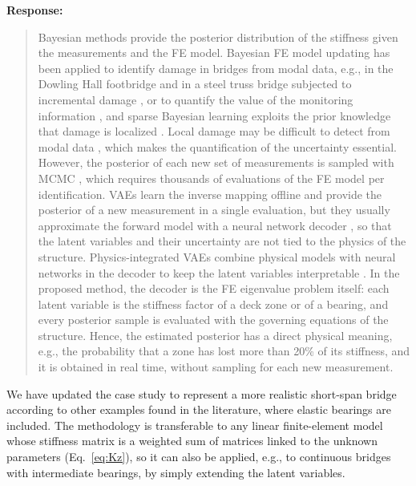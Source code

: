 \documentclass[11pt]{article}
\newenvironment{response}{\par\smallskip\noindent\color{resp}\textbf{Response:}\ }{\par}
\newenvironment{action}{\par\smallskip\noindent\color{resp}\textbf{Action:}\ }{\par}
\newcommand{\authornote}[1]{\textcolor{note}{\textsf{[Authors: #1]}}}
\newcommand{\tbd}[1]{\textcolor{note}{\textsf{[#1]}}}
\newcommand{\lines}[1]{\tbd{lines #1}}
\begin{document}
\begin{response}
\begin{quote}
Bayesian methods provide the posterior distribution of the stiffness given the measurements and the FE model.
Bayesian FE model updating has been applied to identify damage in bridges from modal data, e.g., in the Dowling Hall footbridge \cite{behmanesh2015probabilistic} and in a steel truss bridge subjected to incremental damage \cite{zhou2022vibration}, or to quantify the value of the monitoring information \cite{kamariotis2022value}, and sparse Bayesian learning exploits the prior knowledge that damage is localized \cite{huang2017hierarchical,chen2020sparse}.
Local damage may be difficult to detect from modal data \cite{mustafa2017bayesian}, which makes the quantification of the uncertainty essential.
However, the posterior of each new set of measurements is sampled with MCMC \cite{ching2007transitional}, which requires thousands of evaluations of the FE model per identification.
VAEs learn the inverse mapping offline and provide the posterior of a new measurement in a single evaluation, but they usually approximate the forward model with a neural network decoder \cite{Navamuel_wes2025,bacsa2025structural}, so that the latent variables and their uncertainty are not tied to the physics of the structure.
Physics-integrated VAEs combine physical models with neural networks in the decoder to keep the latent variables interpretable \cite{takeishi2021physics,koune2025adversarial}.
In the proposed method, the decoder is the FE eigenvalue problem itself: each latent variable is the stiffness factor of a deck zone or of a bearing, and every posterior sample is evaluated with the governing equations of the structure.
Hence, the estimated posterior has a direct physical meaning, e.g., the probability that a zone has lost more than 20\% of its stiffness, and it is obtained in real time, without sampling for each new measurement.
\end{quote}
We have updated the case study to represent a more realistic short-span bridge according to other examples found in the literature, where elastic bearings are included. 
The methodology is transferable to any linear finite-element model whose stiffness matrix is a weighted sum of matrices linked to the unknown parameters (Eq.~\eqref{eq:Kz}), so it can also be applied, e.g., to continuous bridges with intermediate bearings, by simply extending the latent variables.

\end{response}
%
\end{document}
